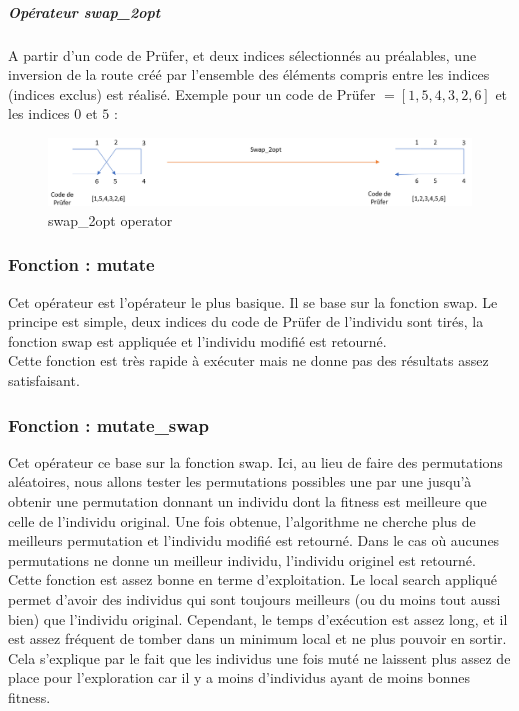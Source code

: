\documentclass{article} %
\begin{document}
\subparagraph{Opérateur swap\_2opt\\}
A partir d'un code de Prüfer, et deux indices sélectionnés au préalables, une inversion de la route créé par l'ensemble des éléments compris entre les indices (indices exclus) est réalisé. Exemple pour un code de Prüfer $ = [1,5,4,3,2,6]$ et les indices $0$ et $5$ :
\begin{figure}[!h]
	\centering
	\includegraphics[keepaspectratio = true,scale=0.8]{2opt.png}
	\caption{swap\_2opt operator}
\end{figure}
\newpage
\subsubsection{Fonction : mutate}
Cet opérateur est l'opérateur le plus basique. Il se base sur la fonction swap.
Le principe est simple, deux indices du code de Prüfer de l'individu sont tirés, la fonction swap est appliquée et l'individu modifié est retourné.\\
Cette fonction est très rapide à exécuter mais ne donne pas des résultats assez satisfaisant. 

\subsubsection{Fonction : mutate\_swap}
Cet opérateur ce base sur la fonction swap. Ici, au lieu de faire des permutations aléatoires, nous allons tester les permutations possibles une par une jusqu'à obtenir une permutation donnant un individu dont la fitness est meilleure que celle de l'individu original. Une fois obtenue,  l'algorithme ne cherche plus de meilleurs permutation et l'individu modifié est retourné. Dans le cas où aucunes permutations ne donne un meilleur individu, l'individu originel est retourné.\\
Cette fonction est assez bonne en terme d'exploitation. Le local search appliqué permet d'avoir des individus qui sont toujours meilleurs (ou du moins tout aussi bien) que l'individu original. Cependant, le temps d'exécution est assez long, et il est assez fréquent de tomber dans un minimum local et ne plus pouvoir en sortir.\\
Cela s'explique par le fait que les individus une fois muté ne laissent plus assez de place pour l'exploration car il y a moins d'individus ayant de moins bonnes fitness.
\end{document}
